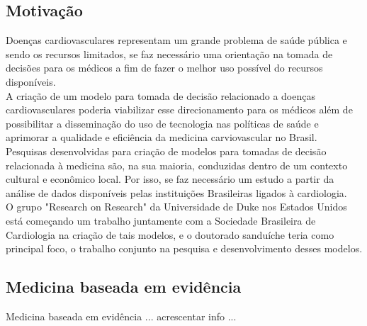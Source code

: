 \documentclass{article}
\begin{document}
\subsection{ \label{subsec:motivacao} Motivação}
Doenças cardiovasculares representam um grande problema de saúde pública e sendo os recursos limitados, 
se faz necessário uma orientação na tomada de decisões para os médicos a fim de fazer o melhor uso possível do 
recursos disponíveis.\\ 
A criação de um modelo para tomada de decisão relacionado a doenças cardiovasculares poderia viabilizar esse 
direcionamento para os médicos além de possibilitar a disseminação do uso de tecnologia nas políticas de saúde e 
aprimorar a qualidade e eficiência da medicina carviovascular no Brasil.\\
Pesquisas desenvolvidas para criação de modelos para tomadas de decisão relacionada à medicina são, na sua maioria, 
conduzidas dentro de um contexto cultural e econômico local. Por isso, se faz necessário um estudo a partir da 
análise de dados disponíveis pelas instituições Brasileiras ligados à cardiologia.\\
O grupo "Research on Research" da Universidade de Duke nos Estados Unidos está começando um trabalho juntamente 
com a Sociedade Brasileira de Cardiologia na criação de tais modelos, e o doutorado sanduíche teria como principal 
foco, o trabalho conjunto na pesquisa e desenvolvimento desses modelos.

\subsection{ \label{subsec:evidencemed} Medicina baseada em evidência}
Medicina baseada em evidência {\color{red} ... acrescentar info ...}
\end{document}
